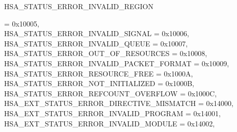 \documentclass[final,oneside]{book}
\newcommand{\reftyp}[1]{#1}
\newcommand{\refenu}[1]{\reftyp{#1}}
\newenvironment{mylongtable}{\rowcolors{0}{lightgray}{lightgray}\longtable} {
\endlongtable}
\begin{document}
\begin{mylongtable}{@{}p{\textwidth}}
\hspace{1.7em}\hypertarget{group__status_1ggad755322e7ff95456520e8abdbe90d225ad63594ac02edec7ae7aa7722c11afcd9}{\refenu{HSA_\-STATUS_\-ERROR_\-INVALID_\-REGION}} = 0x10005,\\
\hspace{1.7em}\hypertarget{group__status_1ggad755322e7ff95456520e8abdbe90d225a7b4c8c0d4c99a1fe966abc2d39b575fe}{\refenu{HSA_\-STATUS_\-ERROR_\-INVALID_\-SIGNAL}} = 0x10006,\\
\hspace{1.7em}\hypertarget{group__status_1ggad755322e7ff95456520e8abdbe90d225aa3c762eb6a61b358702b45259d1686c4}{\refenu{HSA_\-STATUS_\-ERROR_\-INVALID_\-QUEUE}} = 0x10007,\\
\hspace{1.7em}\hypertarget{group__status_1ggad755322e7ff95456520e8abdbe90d225a1a77fcf36d0d140874c4361ab093eff7}{\refenu{HSA_\-STATUS_\-ERROR_\-OUT_\-OF_\-RESOURCES}} = 0x10008,\\
\hspace{1.7em}\hypertarget{group__status_1ggad755322e7ff95456520e8abdbe90d225a3fad45f72111eb99de5d8daef26c372c}{\refenu{HSA_\-STATUS_\-ERROR_\-INVALID_\-PACKET_\-FORMAT}} = 0x10009,\\
\hspace{1.7em}\hypertarget{group__status_1ggad755322e7ff95456520e8abdbe90d225a6406af88203fcbec4179fbb71cc66b65}{\refenu{HSA_\-STATUS_\-ERROR_\-RESOURCE_\-FREE}} = 0x1000A,\\
\hspace{1.7em}\hypertarget{group__status_1ggad755322e7ff95456520e8abdbe90d225a34ea59ade5bfce95eee935238a99f5b5}{\refenu{HSA_\-STATUS_\-ERROR_\-NOT_\-INITIALIZED}} = 0x1000B,\\
\hspace{1.7em}\hypertarget{group__status_1ggad755322e7ff95456520e8abdbe90d225aa9218eed04d1d2ffc5ed8f33f2cd1c9b}{\refenu{HSA_\-STATUS_\-ERROR_\-REFCOUNT_\-OVERFLOW}} = 0x1000C,\\
\hspace{1.7em}\hypertarget{group__status_1ggad755322e7ff95456520e8abdbe90d225ae16bcc443d027a0b880fd58f0443227b}{\refenu{HSA_\-EXT_\-STATUS_\-ERROR_\-DIRECTIVE_\-MISMATCH}} = 0x14000,\\
\hspace{1.7em}\hypertarget{group__status_1ggad755322e7ff95456520e8abdbe90d225a058105c75cdda59126637b8c5c0d893e}{\refenu{HSA_\-EXT_\-STATUS_\-ERROR_\-INVALID_\-PROGRAM}} = 0x14001,\\
\hspace{1.7em}\hypertarget{group__status_1ggad755322e7ff95456520e8abdbe90d225a159ae50ee80394dd6e051f623834ae9c}{\refenu{HSA_\-EXT_\-STATUS_\-ERROR_\-INVALID_\-MODULE}} = 0x14002,\\

\end{mylongtable}
\end{document}
